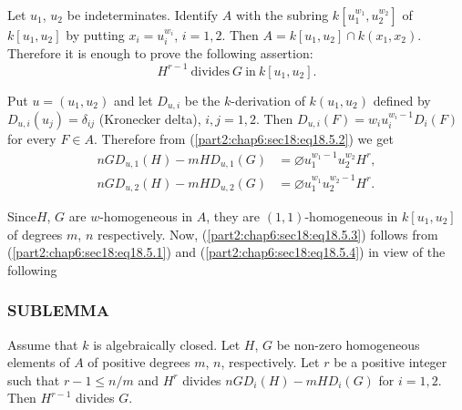 Let $u_1$, $u_2$ be indeterminates. Identify $A$ with the subring
$k[u_1^{w_1}, u_2^{w_2}]$ of $k[u_1, u_2]$ by putting $x_i =
u_i^{w_i}$, $i=1, 2$. Then $A = k[u_1, u_2] \cap k(x_1,
x_2)$. Therefore it is enough to prove the following assertion:
\begin{equation*}
  H^{r-1} ~\text{divides}~ G ~\text{in}~ k[u_1,
    u_2]. \tag{18.5.3}\label{part2:chap6:sec18:eq18.5.3}  
\end{equation*}

Put $u= (u_1, u_2)$ and let $D_{u, i}$ be the $k$-derivation of
$k(u_1, u_2)$ defined by $D_{u, i}(u_j)= \delta_{ij}$ (Kronecker
delta), $i, j=1,2$. Then $D_{u, i}(F) = w_i u_i^{w_i-1}D_i (F)$ for
every $F \in A$. Therefore from (\ref{part2:chap6:sec18:eq18.5.2}) we
get
\begin{equation*}
\begin{aligned}
  nGD_{u, 1} (H) - m H D_{u,1} (G) & = \diameter u_1^{w_1-1} u_2^{w_2} H^r,\\
  nGD_{u, 2} (H) - mHD_{u, 2} (G) & =  \diameter u_1^{w_1} u_2^{w_2-1} H^r.
\end{aligned}\tag{18.5.4}\label{part2:chap6:sec18:eq18.5.4} 
\end{equation*}

Since\pageoriginale $H$, $G$ are $w$-homogeneous in $A$, they are $(1,
1)$-homogeneous in $k[u_1, u_2]$ of degrees $m$, $n$
respectively. Now, (\ref{part2:chap6:sec18:eq18.5.3}) follows from
(\ref{part2:chap6:sec18:eq18.5.1}) and
(\ref{part2:chap6:sec18:eq18.5.4}) in view of the following

\setcounter{subsubsection}{4}
\setcounter{mysubsection}{5}
\subsubsection{\textbf{SUBLEMMA}}

Assume that $k$ is algebraically closed. Let $H$, $G$ be non-zero
homogeneous elements of $A$ of positive degrees $m$, $n$,
respectively. Let $r$ be a positive integer such that $r-1 \leq n/m$
and $H^r$ divides $n G D_i (H)- m HD_i (G)$ for $i =1, 2$. Then
$H^{r-1}$ divides $G$.

